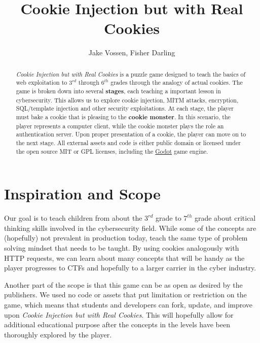 \documentclass{article}
\begin{document}
\title{Cookie Injection but with Real Cookies}
\author{Jake Vossen, Fisher Darling}

\maketitle

\begin{abstract}
  
\textit{Cookie Injection but with Real Cookies} is a puzzle game
designed to teach the basics of web exploitation to $3^{rd}$ through
$6^{th}$ grades through the analogy of actual cookies. The game is
broken down into several \textbf{stages}, each teaching a important
lesson in cybersecurity. This allows us to explore cookie injection,
MITM attacks, encryption, SQL/template injection and other security
exploitations. At each stage, the player must bake a cookie that is
pleasing to the \textbf{cookie monster}. In this scenario, the player
represents a computer client, while the cookie monster plays the role
an authentication server. Upon proper presentation of a cookie, the
player can move on to the next stage. All external assets and code is
either public domain or licensed under the open source MIT or GPL
licenses, including the \href{https://godotengine.org}{Godot} game
engine.



\end{abstract}

\section{Inspiration and Scope}

Our goal is to teach children from about the $3^{rd}$ grade to
$7^{th}$ grade about critical thinking skills involved in the cybersecurity
field. While some of the concepts are (hopefully) not prevalent in
production today, teach the same type of problem solving mindset that
needs to be taught. By using cookies analogously with HTTP requests,
we can learn about many concepts that will be handy as the player
progresses to CTFs and hopefully to a larger carrier in the cyber
industry.

Another part of the scope is that this game can be as open as desired
by the publishers. We used no code or assets that put limitation or
restriction on the game, which means that students and developers can
fork, update, and improve upon \textit{Cookie Injection but with Real
  Cookies}. This will hopefully allow for additional educational
purpose after the concepts in the levels have been thoroughly explored
by the player.
\end{document}
